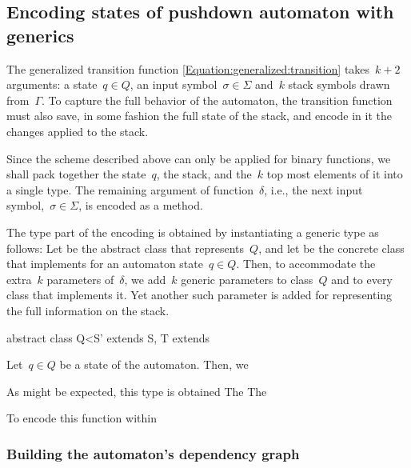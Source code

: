 \subsection{Encoding states of pushdown automaton with \Java generics}
The generalized transition function \cref{Equation:generalized:transition}
  takes~$k+2$ arguments: a state~$q∈Q$, an input symbol~$σ∈Σ$
    and~$k$ stack symbols drawn from~$Γ$.
To capture the full behavior of the automaton, the transition function
  must also save, in some fashion the full state of the stack, and
  encode in it the changes applied to the stack.

Since the scheme described above can only be applied for binary functions,
  we shall pack together the state~$q$, the stack, and the~$k$ top most
  elements of it into a single type.
  The remaining argument of function~$δ$, i.e., the next input symbol,~$σ∈Σ$,
  is encoded as a method.

The type part of the encoding is obtained by instantiating a generic type as follows:
Let  be the abstract class that represents~$Q$, and let  be the concrete class that
  implements  for an automaton state~$q∈Q$.
Then, to accommodate the extra~$k$ parameters of~$δ$, we add~$k$ generic parameters
  to class~$Q$ and to every class  that implements it.
Yet another such parameter is added for representing the full information on the stack.
\begin{JAVA}
abstract class Q<S' extends S, T extends
\end{JAVA}

Let~$q∈Q$ be a state of the automaton. Then, we

  As might be expected, this type is obtained
  The
  The

To encode this function within

\subsubsection{Building the automaton's dependency graph}

